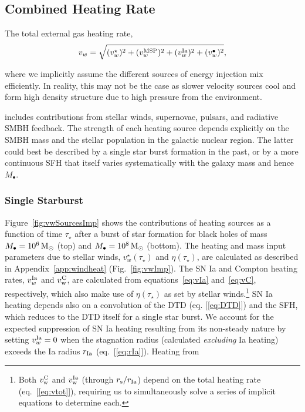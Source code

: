 \documentclass[usenatbib,fleqn]{mn2e}
\newcommand{\Mbh}[1][]{M_{\bullet#1}}
\newcommand{\vwO}{v_{w}}
\begin{document}
\subsection{Combined Heating Rate} 
\label{sec:combined}


The total external gas heating rate, 
\begin{equation}
\vwO = \sqrt{(v_{w}^{\star})^{2} + (v_{w}^{\rm MSP})^{2} + (v_{w}^{\rm Ia})^{2} + (v_{w}^{\bullet})^{2}},
\label{eq:vtot}
\end{equation}

where we implicitly assume the different sources of energy injection mix
efficiently. In reality, this may not be the case as slower velocity
sources cool and form high density structure due to high pressure from
the environment\citep{Cuadra+2005}. 

includes contributions from stellar winds, supernovae, pulsars, and
radiative SMBH feedback.  The strength of each heating source depends
explicitly on the SMBH mass and the stellar population in the galactic
nuclear region.  The latter could best be
described by a single star burst formation in the past, or by a more
continuous SFH that itself varies systematically
with the galaxy mass and hence $\Mbh$.

\subsubsection{Single Starburst}

Figure~\ref{fig:vwSourcesImp} shows the contributions of heating
sources as a function of time $\tau_{\star}$ after a burst of star
formation for black holes of mass $\Mbh = 10^{6} \Msun$ (top) and
$\Mbh = 10^{8} \Msun$ (bottom). The heating and mass input parameters
due to stellar winds, $v_{w}^{\star}(\tau_{\star})$ and
$\eta(\tau_{\star})$, are calculated as described in
Appendix~\ref{app:windheat} (Fig.~\ref{fig:vwImp}).  The SN Ia and
Compton heating rates, $v_{w}^{\rm Ia}$ and $v_{\rm w}^{\rm C}$, are
calculated from equations~\eqref{eq:vIa} and~\eqref{eq:vC},
respectively, which also make use of $\eta(\tau_{\star})$ as set by
stellar winds.\footnote{Both $v_{\rm w}^{\rm C}$ and $v_{\rm w}^{\rm
    Ia}$ (through $r_{\rm s}/r_{\rm Ia}$) depend on the total heating
  rate (eq.~[\ref{eq:vtot}]), requiring us to simultaneously solve a
  series of implicit equations to determine each.}  SN Ia heating
depends also on a convolution of the DTD (eq. [\ref{eq:DTD}]) and the
SFH, which reduces to the DTD itself for a single star burst.  We
account for the expected suppression of SN Ia heating resulting from
its non-steady nature by setting $v_{w}^{\rm Ia} = 0$ when the
stagnation radius (calculated {\it excluding} Ia heating) exceeds the
Ia radius $r_{\rm Ia}$ (eq.~[\ref{eq:rIa}]).  Heating from
\end{document}

